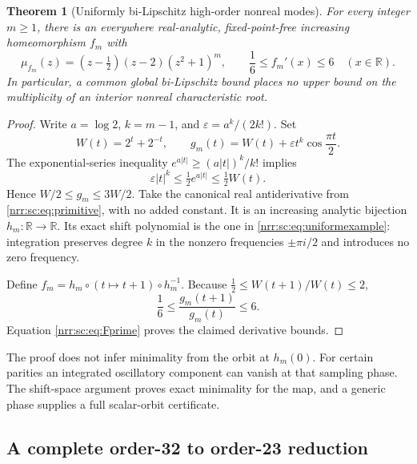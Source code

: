 \documentclass[11pt,letterpaper]{article}
\newtheorem{theorem}{Theorem}[section]
\theoremstyle{definition}
\theoremstyle{remark}
\newcommand{\R}{\mathbb R}
\begin{document}
\begin{theorem}[Uniformly bi-Lipschitz high-order nonreal modes]
\label{nrr:sc:thm:uniform}
For every integer $m\ge1$, there is an everywhere real-analytic,
fixed-point-free increasing homeomorphism $f_m$ with
\begin{equation}
 \mu_{f_m}(z)=(z-\tfrac12)(z-2)(z^2+1)^m,
 \qquad
 \frac16\le f_m'(x)\le6\quad(x\in\R).
 \label{nrr:sc:eq:uniformexample}
\end{equation}
In particular, a common global bi-Lipschitz bound places no upper bound
on the multiplicity of an interior nonreal characteristic root.
\end{theorem}
\begin{proof}
Write $a=\log2$, $k=m-1$, and $\varepsilon=a^k/(2k!)$.
Set
\begin{equation}
 W(t)=2^t+2^{-t},\qquad
 g_m(t)=W(t)+\varepsilon t^k\cos\frac{\pi t}{2}.
 \label{nrr:sc:eq:uniformg}
\end{equation}
The exponential-series inequality
$e^{a|t|}\ge(a|t|)^k/k!$ implies
\[
 \varepsilon|t|^k\le\tfrac12 e^{a|t|}\le\tfrac12W(t).
\]
Hence $W/2\le g_m\le3W/2$.
Take the canonical real antiderivative from \eqref{nrr:sc:eq:primitive},
with no added constant. It is an increasing analytic bijection
$h_m:\R\to\R$. Its exact shift polynomial is the one in
\eqref{nrr:sc:eq:uniformexample}: integration preserves degree $k$ in the
nonzero frequencies $\pm\pi i/2$ and introduces no zero frequency.

Define $f_m=h_m\circ(t\mapsto t+1)\circ h_m^{-1}$.
Because $\tfrac12\le W(t+1)/W(t)\le2$,
\[
 \frac16\le\frac{g_m(t+1)}{g_m(t)}\le6.
\]
Equation \eqref{nrr:sc:eq:Fprime} proves the claimed derivative bounds.
\end{proof}

The proof does not infer minimality from the orbit at $h_m(0)$.
For certain parities an integrated oscillatory component can vanish at
that sampling phase. The shift-space argument proves exact minimality
for the map, and a generic phase supplies a full scalar-orbit certificate.

\subsection{A complete order-32 to order-23 reduction}
\end{document}
